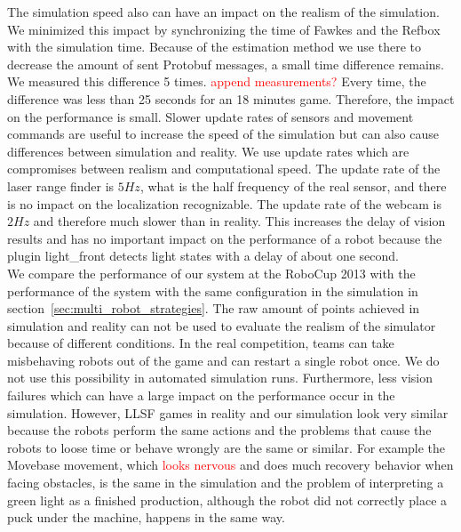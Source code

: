 The simulation speed also can have an impact on the realism of the simulation. We minimized this impact by synchronizing the time of Fawkes and the Refbox with the simulation time. Because of the estimation method we use there to decrease the amount of sent Protobuf messages, a small time difference remains. We measured this difference 5 times. \textcolor{red}{append measurements?} Every time, the difference was less than 25 seconds for an 18 minutes game. Therefore, the impact on the performance is small.
Slower update rates of sensors and movement commands are useful to increase the speed of the simulation but can also cause differences between simulation and reality. We use update rates which are compromises between realism and computational speed. The update rate of the laser range finder is $5 Hz$, what is the half frequency of the real sensor, and there is no impact on the localization recognizable. The update rate of the webcam is $2 Hz$ and therefore much slower than in reality. This increases the delay of vision results and has no important impact on the performance of a robot because the plugin light\_front detects light states with a delay of about one second.\\
We compare the performance of our system at the RoboCup 2013 with the performance of the system with the same configuration in the simulation in section~\ref{sec:multi_robot_strategies}. The raw amount of points achieved in simulation and reality can not be used to evaluate the realism of the simulator because of different conditions. In the real competition, teams can take misbehaving robots out of the game and can restart a single robot once. We do not use this possibility in automated simulation runs. Furthermore, less vision failures which can have a large impact on the performance occur in the simulation. However, LLSF games in reality and our simulation look very similar because the robots perform the same actions and the problems that cause the robots to loose time or behave wrongly are the same or similar. For example the Movebase movement, which \textcolor{red}{looks nervous} and does much recovery behavior when facing obstacles, is the same in the simulation and the problem of interpreting a green light as a finished production, although the robot did not correctly place a puck under the machine, happens in the same way.

